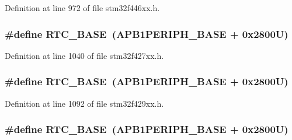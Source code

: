 Definition at line 972 of file stm32f446xx.\+h.

\subsubsection[{\texorpdfstring{R\+T\+C\+\_\+\+B\+A\+SE}{RTC_BASE}}]{\setlength{\rightskip}{0pt plus 5cm}\#define R\+T\+C\+\_\+\+B\+A\+SE~({\bf A\+P\+B1\+P\+E\+R\+I\+P\+H\+\_\+\+B\+A\+SE} + 0x2800\+U)}\hypertarget{group___peripheral__memory__map_ga4265e665d56225412e57a61d87417022}{}\label{group___peripheral__memory__map_ga4265e665d56225412e57a61d87417022}


Definition at line 1040 of file stm32f427xx.\+h.

\subsubsection[{\texorpdfstring{R\+T\+C\+\_\+\+B\+A\+SE}{RTC_BASE}}]{\setlength{\rightskip}{0pt plus 5cm}\#define R\+T\+C\+\_\+\+B\+A\+SE~({\bf A\+P\+B1\+P\+E\+R\+I\+P\+H\+\_\+\+B\+A\+SE} + 0x2800\+U)}\hypertarget{group___peripheral__memory__map_ga4265e665d56225412e57a61d87417022}{}\label{group___peripheral__memory__map_ga4265e665d56225412e57a61d87417022}


Definition at line 1092 of file stm32f429xx.\+h.

\subsubsection[{\texorpdfstring{R\+T\+C\+\_\+\+B\+A\+SE}{RTC_BASE}}]{\setlength{\rightskip}{0pt plus 5cm}\#define R\+T\+C\+\_\+\+B\+A\+SE~({\bf A\+P\+B1\+P\+E\+R\+I\+P\+H\+\_\+\+B\+A\+SE} + 0x2800\+U)}\hypertarget{group___peripheral__memory__map_ga4265e665d56225412e57a61d87417022}{}\label{group___peripheral__memory__map_ga4265e665d56225412e57a61d87417022}


